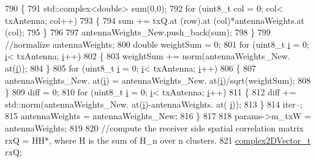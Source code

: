\begin{DoxyCode}
790                 \{
791                         std::complex<double> sum(0,0);
792                         \textcolor{keywordflow}{for} (uint8\_t col = 0; col< txAntenna; col++)
793                         \{
794                                 sum += txQ.at (row).at (col)*antennaWeights.at (col);
795                         \}
796 
797                     antennaWeights\_New.push\_back(sum);
798                 \}
799                 \textcolor{comment}{//normalize antennaWeights;}
800                 \textcolor{keywordtype}{double} weightSum = 0;
801                 \textcolor{keywordflow}{for} (uint8\_t \hyperlink{bernuolliDistribution_8m_a6f6ccfcf58b31cb6412107d9d5281426}{i} = 0; \hyperlink{bernuolliDistribution_8m_a6f6ccfcf58b31cb6412107d9d5281426}{i}< txAntenna; \hyperlink{bernuolliDistribution_8m_a6f6ccfcf58b31cb6412107d9d5281426}{i}++)
802                 \{
803                         weightSum += norm(antennaWeights\_New. at(\hyperlink{bernuolliDistribution_8m_a6f6ccfcf58b31cb6412107d9d5281426}{i}));
804                 \}
805                 \textcolor{keywordflow}{for} (uint8\_t \hyperlink{bernuolliDistribution_8m_a6f6ccfcf58b31cb6412107d9d5281426}{i} = 0; \hyperlink{bernuolliDistribution_8m_a6f6ccfcf58b31cb6412107d9d5281426}{i}< txAntenna; \hyperlink{bernuolliDistribution_8m_a6f6ccfcf58b31cb6412107d9d5281426}{i}++)
806                 \{
807                         antennaWeights\_New. at(\hyperlink{bernuolliDistribution_8m_a6f6ccfcf58b31cb6412107d9d5281426}{i}) = antennaWeights\_New. at(\hyperlink{bernuolliDistribution_8m_a6f6ccfcf58b31cb6412107d9d5281426}{i})/sqrt(weightSum);
808                 \}
809                 diff = 0;
810                 \textcolor{keywordflow}{for} (uint8\_t \hyperlink{bernuolliDistribution_8m_a6f6ccfcf58b31cb6412107d9d5281426}{i} = 0; \hyperlink{bernuolliDistribution_8m_a6f6ccfcf58b31cb6412107d9d5281426}{i}< txAntenna; \hyperlink{bernuolliDistribution_8m_a6f6ccfcf58b31cb6412107d9d5281426}{i}++)
811                 \{
812                         diff += std::norm(antennaWeights\_New. at(\hyperlink{bernuolliDistribution_8m_a6f6ccfcf58b31cb6412107d9d5281426}{i})-antennaWeights. at(
      \hyperlink{bernuolliDistribution_8m_a6f6ccfcf58b31cb6412107d9d5281426}{i}));
813                 \}
814                 iter--;
815                 antennaWeights = antennaWeights\_New;
816         \}
817 
818         params->m\_txW = antennaWeights;
819 
820         \textcolor{comment}{//compute the receiver side spatial correlation matrix rxQ = HH*, where H is the sum of H\_n over n
       clusters.}
821         \hyperlink{namespacens3_aa25e3feece2676fd7470d50d4ba3d1d1}{complex2DVector\_t} rxQ;

\end{DoxyCode}
